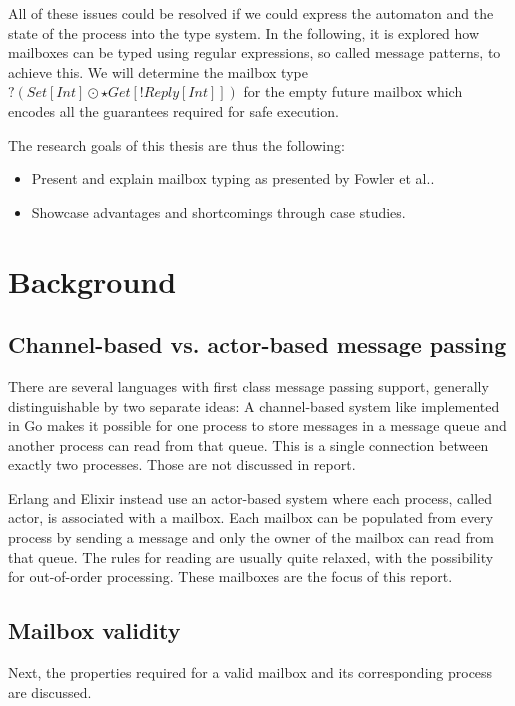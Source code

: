 All of these issues could be resolved if we could express the automaton and the state of the process into the type system.
In the following, it is explored how mailboxes can be typed using regular expressions, so called message patterns, to achieve this.
We will determine the mailbox type $?(Set[Int] \odot \star Get[!Reply[Int]])$ for the empty future mailbox which encodes all the guarantees required for safe execution.

The research goals of this thesis are thus the following:
\begin{itemize}
    \item Present and explain mailbox typing as presented by Fowler et al.\cite{fowlerSpecialDeliveryProgramming2023}.
    \item Showcase advantages and shortcomings through case studies.
\end{itemize}


\section{Background}
\label{sec:background}

\subsection{Channel-based vs. actor-based message passing}

There are several languages with first class message passing support, generally distinguishable by two separate ideas: A channel-based system like implemented in Go makes it possible for one process to store messages in a message queue and another process can read from that queue.
This is a single connection between exactly two processes.
Those are not discussed in report.

Erlang and Elixir instead use an actor-based system where each process, called actor, is associated with a mailbox.
Each mailbox can be populated from every process by sending a message and only the owner of the mailbox can read from that queue.
The rules for reading are usually quite relaxed, with the possibility for out-of-order processing.
These mailboxes are the focus of this report.



\subsection{Mailbox validity}

Next, the properties required for a valid mailbox and its corresponding process are discussed.

